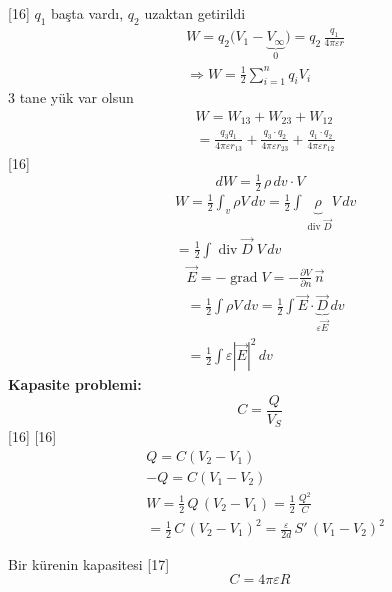 \documentclass[11pt,a4paper]{article}
\begin{document}
[16]
$q_1$ başta vardı, $q_2$ uzaktan getirildi
\begin{align*}
&W=q_2\bigl(V_1-\underbrace{V_\infty}_{0}\bigr)=q_2\,\frac{q_1}{4\pi\varepsilon r}\\
&\Rightarrow W=\frac12\sum_{i=1}^{n}q_iV_i
\end{align*}
3 tane yük var olsun
\begin{align*}
&W=W_{13}+W_{23}+W_{12}\\
&=\frac{q_3q_1}{4\pi\varepsilon r_{13}}+\frac{q_3\cdot q_2}{4\pi\varepsilon r_{23}}+\frac{q_1\cdot q_2}{4\pi\varepsilon r_{12}}
\end{align*}
[16]
\[ dW=\tfrac12\,\rho\,dv\cdot V \]
\begin{align*}
&W=\frac12\int_v\rho V\,dv=\frac12\int\underbrace{\rho}_{\operatorname{div}\vec D}V\,dv\\
&=\frac12\int\operatorname{div}\vec D\;V\,dv
\end{align*}
\begin{align*}
&\vec E=-\operatorname{grad}V=-\frac{\partial V}{\partial n}\,\vec n\\
&=\frac12\int\rho V\,dv=\frac12\int\vec E\cdot\underbrace{\vec D}_{\varepsilon\vec E}\,dv\\
&=\frac12\int\varepsilon|\vec E|^2\,dv
\end{align*}
\textbf{Kapasite problemi:}
\[ C=\frac{Q}{V_S} \]
[16]
[16]
\begin{align*}
&Q=C(V_2-V_1)\\
&-Q=C(V_1-V_2)\\
&W=\frac12\,Q\,(V_2-V_1)=\frac12\,\frac{Q^2}{C}\\
&=\frac12\,C\,(V_2-V_1)^2=\frac{\varepsilon}{2d}\,S'\,(V_1-V_2)^2
\end{align*}
\begin{center}
\end{center}

Bir kürenin kapasitesi
[17]
\[ C=4\pi\varepsilon R \]
\end{document}
